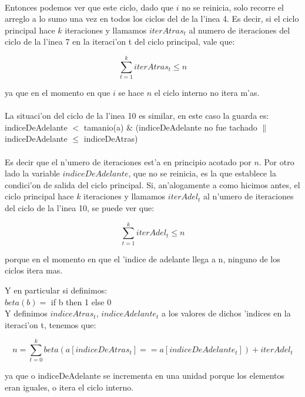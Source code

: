 \paragraph{}
Entonces podemos ver que este ciclo, dado que $i$ no se reinicia, solo recorre el arreglo a lo sumo una 
vez en todos los ciclos del de la l'inea 4. Es decir, si el ciclo principal hace $k$ iteraciones y llamamos 
$iterAtras_t$ al numero de iteraciones del ciclo de la l'inea 7 en la iteraci'on t del ciclo principal, vale que:

$$\sum_{t=1}^{k}iterAtras_t \leq n$$

ya que en el momento en que $i$ se hace $n$ el ciclo interno no itera m'as.
\paragraph{}
La situaci'on del ciclo de la l'inea 10 es similar, en este caso la guarda es:\\

indiceDeAdelante $<$ tamanio(a) $\&$ (indiceDeAdelante no fue tachado $\|$ indiceDeAdelante $\leq$ indiceDeAtras)

\paragraph{}
Es decir que el n'umero de iteraciones est'a en principio acotado por $n$. Por otro lado la variable $indiceDeAdelante$, 
que no se reinicia, es la que establece la condici'on de salida del ciclo principal. Si, an'alogamente a como hicimos 
antes, el ciclo principal hace $k$ iteraciones y llamamos $iterAdel_t$ al n'umero de iteraciones del ciclo de 
la l'inea 10, se puede ver que:

$$\sum_{t=1}^{k}iterAdel_t \leq n$$

porque en el momento en que el 'indice de adelante llega a n, ninguno de los ciclos itera mas.

Y en particular si definimos:\\

$beta(b) =$ if b then 1 else 0 \\

Y definimos $indiceAtras_t$, $indiceAdelante_t$ a los valores de dichos 'indices en la iteraci'on t, tenemos que:

$$n=\sum_{t=0}^{k}beta(a[indiceDeAtras_t] == a[indiceDeAdelante_t])+ iterAdel_t$$

ya que o indiceDeAdelante se incrementa en una unidad porque los elementos eran iguales, o itera el ciclo interno.\\

